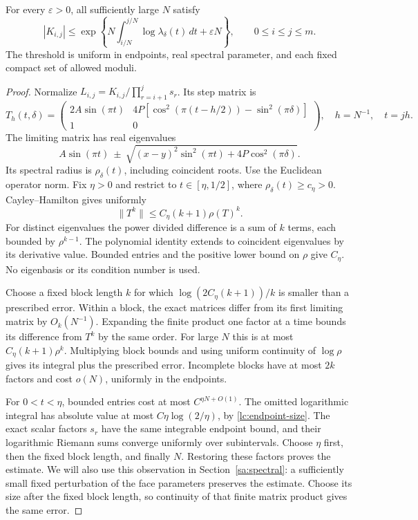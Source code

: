 \begin{lemma}\label{lc:slow-transfer}
For every \(\varepsilon>0\), all sufficiently large \(N\) satisfy
\begin{equation}\label{lc:transfer-estimate}
 |K_{i,j}|\le
 \exp\left\{N\int_{i/N}^{j/N}\log\lambda_\delta(t)\,dt+\varepsilon N\right\},
                      \qquad0\le i\le j\le m.
\end{equation}
The threshold is uniform in endpoints, real spectral parameter,
and each fixed compact set of allowed moduli.
\end{lemma}
\begin{proof}
Normalize \(L_{i,j}=K_{i,j}/\prod_{r=i+1}^js_r\). Its step matrix is
\[
 T_h(t,\delta)=
 \begin{pmatrix}
 2A\sin(\pi t)&4P[\cos^2(\pi(t-h/2))-\sin^2(\pi\delta)]\\1&0
 \end{pmatrix},\quad h=N^{-1},\quad t=jh.
\]
The limiting matrix has real eigenvalues
\[
 A\sin(\pi t)\ \pm\
       \sqrt{(x-y)^2\sin^2(\pi t)+4P\cos^2(\pi\delta)}.
\]
Its spectral radius is \(\rho_\delta(t)\), including coincident roots.
Use the Euclidean operator norm. Fix \(\eta>0\) and restrict to
\(t\in[\eta,1/2]\), where
\(\rho_\delta(t)\ge c_\eta>0\). Cayley--Hamilton gives uniformly
\begin{equation}\label{lc:constant-power}
                    \|T^k\|\le C_\eta(k+1)\rho(T)^k .
\end{equation}
For distinct eigenvalues the power divided difference is a sum of
\(k\) terms, each bounded by \(\rho^{k-1}\). The polynomial identity
extends to coincident eigenvalues by its derivative value. Bounded
entries and the positive lower bound on \(\rho\) give \(C_\eta\).
No eigenbasis or its condition number is used.

Choose a fixed block length \(k\) for which
\(\log(2C_\eta(k+1))/k\) is smaller than a prescribed error.
Within a block, the exact matrices differ from its first limiting
matrix by \(O_k(N^{-1})\). Expanding the finite product one factor
at a time bounds its difference from \(T^k\) by the same order.
For large \(N\) this is at most \(C_\eta(k+1)\rho^k\).
Multiplying block bounds and using uniform continuity of \(\log\rho\)
gives its integral plus the prescribed error. Incomplete blocks have
at most \(2k\) factors and cost \(o(N)\), uniformly in the endpoints.

For \(0<t<\eta\), bounded entries cost at most \(C^{\eta N+O(1)}\).
The omitted logarithmic integral has absolute value at most
\(C\eta\log(2/\eta)\), by \eqref{lc:endpoint-size}.
The exact scalar factors \(s_r\) have the same integrable endpoint
bound, and their logarithmic Riemann sums converge uniformly over
subintervals. Choose \(\eta\) first, then the fixed block length,
and finally \(N\). Restoring these factors proves the estimate.
We will also use this observation in Section~\ref{sa:spectral}:
a sufficiently small fixed perturbation of the face parameters
preserves the estimate. Choose its size after the fixed block length,
so continuity of that finite matrix product gives the same error.
\end{proof}

